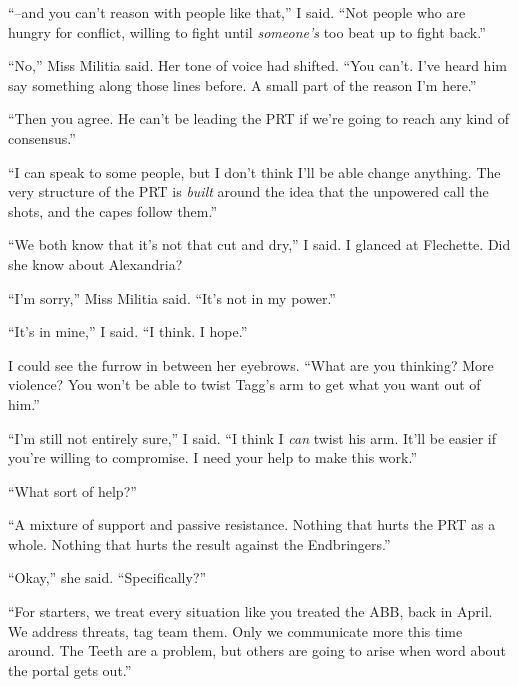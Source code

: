 ``--and you can't reason with people like that,'' I said.  ``Not people who are hungry for conflict, willing to fight until \emph{someone's} too beat up to fight back.''



``No,'' Miss Militia said.  Her tone of voice had shifted.  ``You can't.  I've heard him say something along those lines before.  A small part of the reason I'm here.''



``Then you agree.  He can't be leading the PRT if we're going to reach any kind of consensus.''



``I can speak to some people, but I don't think I'll be able change anything.  The very structure of the PRT is \emph{built} around the idea that the unpowered call the shots, and the capes follow them.''



``We both know that it's not that cut and dry,'' I said.  I glanced at Flechette.  Did she know about Alexandria?



``I'm sorry,'' Miss Militia said.  ``It's not in my power.''



``It's in mine,'' I said.  ``I think.  I hope.''



I could see the furrow in between her eyebrows.  ``What are you thinking?  More violence?  You won't be able to twist Tagg's arm to get what you want out of him.''



``I'm still not entirely sure,'' I said.  ``I think I \emph{can} twist his arm.  It'll be easier if you're willing to compromise.  I need your help to make this work.''



``What sort of help?''



``A mixture of support and passive resistance.  Nothing that hurts the PRT as a whole.  Nothing that hurts the result against the Endbringers.''



``Okay,'' she said.  ``Specifically?''



``For starters, we treat every situation like you treated the ABB, back in April.  We address threats, tag team them.  Only we communicate more this time around.  The Teeth are a problem, but others are going to arise when word about the portal gets out.''



